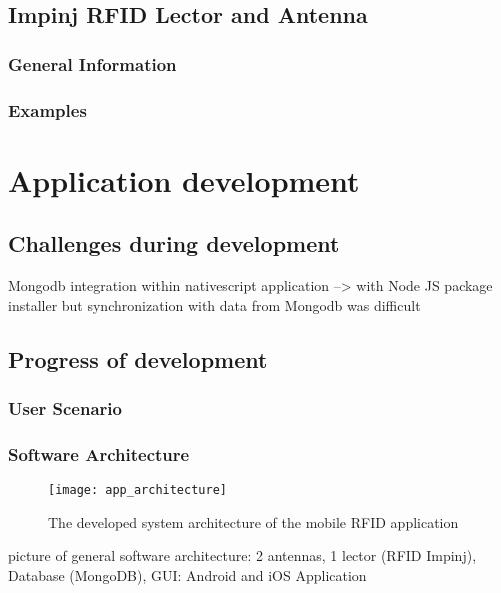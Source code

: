 \subsection{Impinj RFID Lector and Antenna}

\subsubsection{General Information}

\subsubsection{Examples}

%
%
\section{Application development}

\subsection{Challenges during development}

Mongodb integration within nativescript application 
--> with Node JS package installer 
but synchronization with data from Mongodb was difficult

\subsection{Progress of development}

\subsubsection{User Scenario}

\subsubsection{Software Architecture}

\begin{figure}
\centering
\texttt{[image: app\_architecture]} 
\caption{\label{fig:apparchitecture} The developed system architecture of the mobile RFID application}
\end{figure}

picture of general software architecture: 
2 antennas, 1 lector (RFID Impinj), Database (MongoDB), GUI: Android and  iOS Application 


